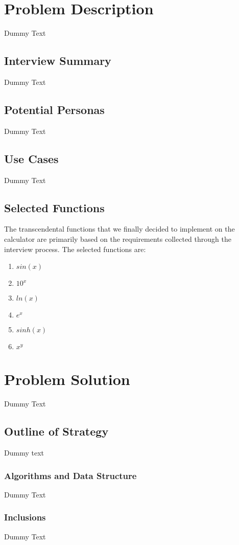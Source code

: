 \documentclass[12pt]{article}
\begin{document}
\section{Problem Description}
Dummy Text

\subsection{Interview Summary}
Dummy Text

\subsection{Potential Personas}
Dummy Text

\subsection{Use Cases}
Dummy Text

\subsection{Selected Functions}
The transcendental functions that we finally decided to implement on the calculator are primarily based on the requirements
collected through the interview process. \newline
The selected functions are:
\begin{enumerate}
    \item $sin(x)$
    \item $10^x$
    \item $ln(x)$
    \item $e^x$
    \item $sinh(x)$
    \item $x^y$
\end{enumerate}


\section{Problem Solution}
Dummy Text

\subsection{Outline of Strategy}
Dummy text
    \subsubsection{Algorithms and Data Structure}
    Dummy Text
    \subsubsection{Inclusions}
    Dummy Text
\end{document}
